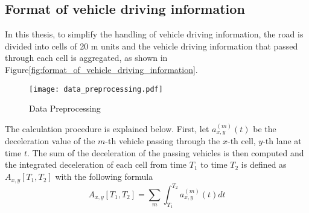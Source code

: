 \documentclass[paper]{ieice}
\begin{document}
\subsection{Format of vehicle driving information}
\label{sec:format_of_vehicle_driving_information}
%
In this thesis, to simplify the handling of vehicle driving information, the road is divided into cells of 20 m units and the vehicle driving information that passed through each cell is aggregated, as shown in Figure\ref{fig:format_of_vehicle_driving_information}.
%
\begin{figure}[tb]
  \begin{center}
    \texttt{[image: data\_preprocessing.pdf]}
  \end{center}
  \caption{Data Preprocessing}
  \label{fig:data_preprocessing}
\end{figure}
%
The calculation procedure is explained below.
%
First, let $a_{x, y}^{(m)}(t)$ be the deceleration value of the $m$-th vehicle passing through the $x$-th cell, $y$-th lane at time $t$.
%
The sum of the deceleration of the passing vehicles is then computed and the integrated deceleration of each cell from time $T_1$ to time $T_2$ is defined as $A_{x, y}[T_1, T_2]$ with the following formula
%
\begin{equation}
  A_{x, y}[T_1,T_2]=\displaystyle\sum_{m}\int_{T_1}^{T_2} a_{x,y}^{(m)}(t)dt
  \label{eq:formatted_data}
\end{equation}
%
\end{document}
